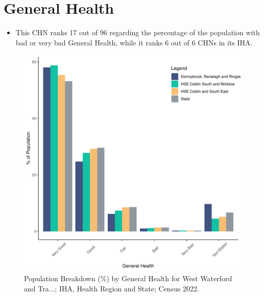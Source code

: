 \documentclass{article}
\begin{document}
\pagebreak

\section{General Health}\label{sect:GenHealth}
\begin{itemize}
\item  This CHN ranks  17 out of 96 regarding the percentage of the population with bad or very bad General Health, while it ranks   6 out of 6 CHNs in its IHA.
\end{itemize}
\begin{figure}[h]
	\centering
	\includegraphics[width = 150mm]{../figures/GenED.pdf}
	\caption{Population Breakdown (\%) by General Health for West Waterford and Tra...; IHA, Health Region and State;  Census 2022.}
	\label{fig:2ae19629-1a6a-13a3-e055-000000000001}
	\end{figure}
\end{document}
